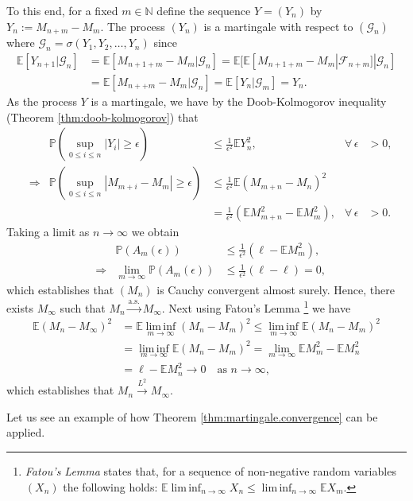\documentclass[12pt]{book}
\let\varepsilon\epsilon
\numberwithin{equation}{chapter}
\theoremstyle{plain}
\numberwithin{theorem}{section}
\theoremstyle{definition}
\numberwithin{exercise}{chapter}
\let\oldendproof\endproof
\renewenvironment{proof}[1][\proofname]{%
  \oldproof[\scshape\underline{#1}]%
}{\oldendproof}
\newcommand{\<}{\langle}
\renewcommand{\>}{\rangle}
\renewcommand{\(}{\left(}
\renewcommand{\)}{\right)}
\renewcommand{\[}{\left[}
\renewcommand{\]}{\right]}
\newcommand\Eb{\mathds{E}}
\newcommand\Pb{\mathds{P}}
\newcommand\Nb{\mathds{N}}
\newcommand\Fc{\mathscr{F}}
\newcommand\Gc{\mathscr{G}}
\newcommand\eps{\varepsilon}
\newcommand\sig{\sigma}
\begin{document}
\begin{proof}
To this end, for a fixed $m \in \Nb$ define the sequence $Y = (Y_n)$ by $Y_n := M_{n+m} - M_m$.  The process $(Y_n)$ is a martingale with respect to $(\Gc_n)$  where $\Gc_n = \sig(Y_1, Y_2, \ldots, Y_n)$ since
\begin{align}
\Eb[ Y_{n+1} | \Gc_n ]
	&=	\Eb[  M_{n+1+m}- M_m  | \Gc_n ]
	=		\Eb[ \Eb[ M_{n+1+m}- M_m| \Fc_{n+m}] | \Gc_n ] \\
	&=	\Eb[ M_{n++m} - M_m | \Gc_n ]
	=		\Eb[ Y_n | \Gc_m ]
	=		Y_n .
\end{align}
As the process $Y$ is a martingale, we have by the Doob-Kolmogorov inequality (Theorem \ref{thm:doob-kolmogorov}) that
\begin{align}
&&
\Pb( \sup_{0 \leq i \leq n} |Y_i| \geq \eps )
	&\leq	\tfrac{1}{\eps^2} \Eb Y_n^2 , &
\forall \, \eps
	&>	0 , \\
&\Rightarrow&
\Pb( \sup_{0 \leq i \leq n} |M_{m+i}-M_m| \geq \eps )
	&\leq	\tfrac{1}{\eps^2} \Eb (M_{m+n}-M_n)^2 \\ & &
	&=		\tfrac{1}{\eps^2} ( \Eb M_{m+n}^2 - \Eb M_m^2), &
\forall \, \eps
	&>	0 .
\end{align} 
Taking a limit as $n \to \infty$ we obtain
\begin{align}
&&
\Pb( A_m(\eps))
	&\leq \tfrac{1}{\eps^2}( \ell - \Eb M_m^2 ) , \\
&\Rightarrow&
\lim_{m \to \infty} \Pb( A_m(\eps))
	&\leq \tfrac{1}{\eps^2}( \ell - \ell ) = 0 ,
\end{align}
which establishes that $(M_n)$ is Cauchy convergent almost surely.  Hence, there exists $M_\infty$ such that $M_n \stackrel{\text{a.s.}}{\to} M_\infty$.
Next using Fatou's Lemma
\footnote{
\emph{Fatou's Lemma} states that, for a sequence of non-negative random variables $(X_n)$ the following holds:
$\Eb \operatorname*{lim\,inf}_{n \to \infty} X_n \leq \operatorname*{lim\,inf}_{n \to \infty} \Eb X_m$.
}
we have
\begin{align}
\Eb (M_n - M_\infty)^2
	&=	\Eb \operatorname*{lim\,inf}_{m \to \infty} (M_n - M_m)^2
	\leq \operatorname*{lim\,inf}_{m \to \infty} \Eb  (M_n - M_m)^2 \\
	&=		\operatorname*{lim\,inf}_{m \to \infty} \Eb  (M_n - M_m)^2 
	=	\lim_{m \to \infty} \Eb M_m^2 - \Eb M_n^2 \\
	&=	\ell - \Eb M_n^2 \to 0 \quad \text{as $n \to \infty$,}
\end{align}
which establishes that $M_n \stackrel{L^2}{\to} M_\infty$.
\end{proof}

\noindent
Let us see an example of how Theorem \ref{thm:martingale.convergence} can be applied.
\end{document}
